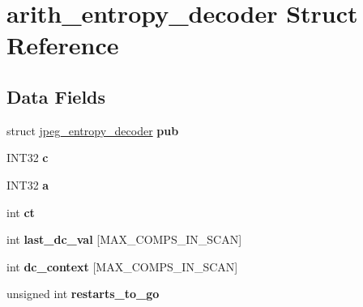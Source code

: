 \hypertarget{structarith__entropy__decoder}{}\section{arith\+\_\+entropy\+\_\+decoder Struct Reference}
\label{structarith__entropy__decoder}
\subsection*{Data Fields}
\begin{DoxyCompactItemize}
\item 
\mbox{\label{structarith__entropy__decoder_a409cf5f871f45956e45ccd51d9c13e2e}} 
struct \hyperlink{structjpeg__entropy__decoder}{jpeg\+\_\+entropy\+\_\+decoder} {\bfseries pub}
\item 
\mbox{\label{structarith__entropy__decoder_a4e0e457e39bddc05b3d661565ad18c61}} 
I\+N\+T32 {\bfseries c}
\item 
\mbox{\label{structarith__entropy__decoder_a9c1a5b250cc6b8764890cce115391517}} 
I\+N\+T32 {\bfseries a}
\item 
\mbox{\label{structarith__entropy__decoder_a55ca1a06f8591241cf96128f403e8f64}} 
int {\bfseries ct}
\item 
\mbox{\label{structarith__entropy__decoder_a9617d03ea0b915e3b718eea8c0948492}} 
int {\bfseries last\+\_\+dc\+\_\+val} \mbox{[}M\+A\+X\+\_\+\+C\+O\+M\+P\+S\+\_\+\+I\+N\+\_\+\+S\+C\+AN\mbox{]}
\item 
\mbox{\label{structarith__entropy__decoder_afd0ab9175e5fe45bf51db9f594e6839f}} 
int {\bfseries dc\+\_\+context} \mbox{[}M\+A\+X\+\_\+\+C\+O\+M\+P\+S\+\_\+\+I\+N\+\_\+\+S\+C\+AN\mbox{]}
\item 
\mbox{\label{structarith__entropy__decoder_a50bb63b0114a26bccea7f609f1eb0d28}} 
unsigned int {\bfseries restarts\+\_\+to\+\_\+go}
\item 
\mbox{\label{structarith__entropy__decoder_a6a7c51c53e6f544b595db8b927672093}} 

\end{DoxyCompactItemize}
